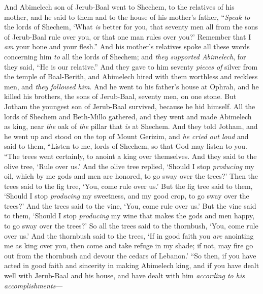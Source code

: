 \begin{biblechapter} %
 And Abimelech son of Jerub-Baal went to Shechem, to the relatives of his mother, and he said to them and to the house of his mother’s father,
\verse “\textit{Speak to} the lords of Shechem, ‘What \textit{is} better for you, that seventy men all from the sons of Jerub-Baal rule over you, or that one man rules over you?’ Remember that I \textit{am} your bone and your flesh.”
\verse And his mother’s relatives spoke all these words concerning him \textit{to} all the lords of Shechem; and \textit{they supported Abimelech}, for they said, “He is our relative.”
\verse And they gave to him seventy \textit{pieces of} silver from the temple of Baal-Berith, and Abimelech hired with them worthless and reckless men, and \textit{they followed him}.
\verse And he went to his father’s house at Ophrah, and he killed his brothers, the sons of Jerub-Baal, seventy men, on one stone. But Jotham the youngest son of Jerub-Baal survived, because he hid himself.
\verse All the lords of Shechem and Beth-Millo gathered, and they went and made Abimelech as king, near \textit{the} oak of \textit{the} pillar that \textit{is} at Shechem.
\verse And they told Jotham, and he went up and stood on the top of Mount Gerizim, and \textit{he cried out loud} and said to them, “Listen to me, lords of Shechem, so that God may listen to you.
\verse “The trees went certainly, 
to anoint a king over themselves. 
And they said to the olive tree, 
‘Rule over us.’
\verse And the olive tree replied, 
‘Should I stop \textit{producing} my oil, 
which by me gods and men are honored, 
to go sway over the trees?’
\verse Then the trees said to the fig tree, 
‘You, come rule over us.’
\verse But the fig tree said to them, 
‘Should I stop \textit{producing} my sweetness, 
and my good crop, 
to go sway over the trees?’
\verse And the trees said to the vine, 
‘You, come rule over us.’
\verse But the vine said to them, 
‘Should I stop \textit{producing} my wine 
that makes the gods and men happy, 
to go sway over the trees?’
\verse So all the trees said to the thornbush, 
‘You, come rule over us.’
\verse And the thornbush said to the trees, 
‘If in good faith you \textit{are} anointing 
me as king over you, 
then come and take refuge in my shade; 
if not, may fire go out from the thornbush 
and devour the cedars of Lebanon.’
\verse “So then, if you have acted in good faith and sincerity in making Abimelech king, and if you have dealt well with Jerub-Baal and his house, and have dealt with him \textit{according to his accomplishments}—

\end{biblechapter}
